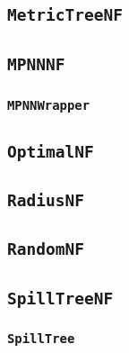 \subsection{\texttt{MetricTreeNF}}

\subsection{\texttt{MPNNNF}}

\subsubsection{\texttt{MPNNWrapper}}

\subsection{\texttt{OptimalNF}}

\subsection{\texttt{RadiusNF}}

\subsection{\texttt{RandomNF}}

\subsection{\texttt{SpillTreeNF}}

\subsubsection{\texttt{SpillTree}}
